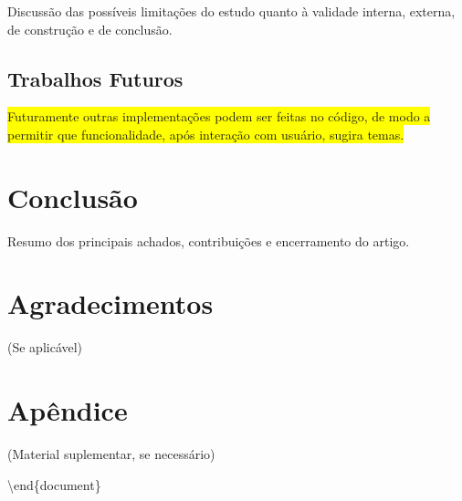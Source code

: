 \documentclass[
]{article}
\begin{document}
Discussão das possíveis limitações do estudo quanto à validade interna,
externa, de construção e de conclusão.

\subsection{Trabalhos Futuros}

\colorbox{yellow}{Futuramente outras implementações podem ser feitas no código, de modo a permitir que funcionalidade, após interação com usuário, sugira temas.}

\section{Conclusão}

Resumo dos principais achados, contribuições e encerramento do artigo.

\section*{Agradecimentos}

(Se aplicável)




\appendix
\section*{Apêndice}

(Material suplementar, se necessário)

\textbackslash end\{document\}
\end{document}
